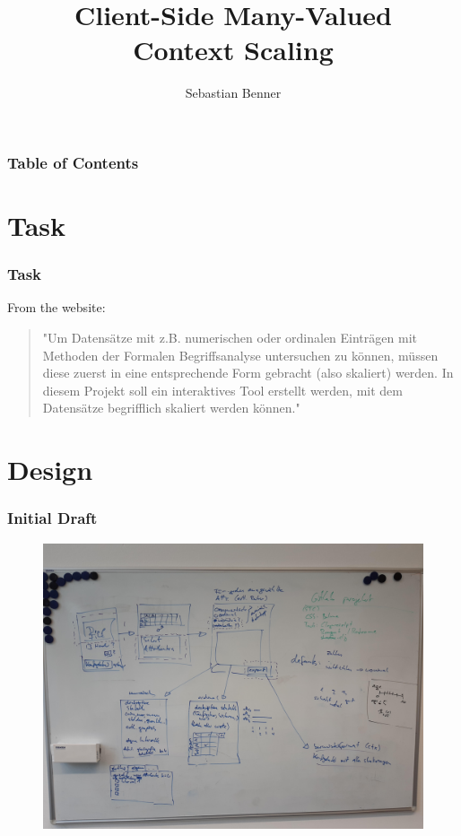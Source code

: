 \documentclass[]{beamer}
\title{Client-Side Many-Valued \protect\\ Context Scaling}
\author[]{Sebastian Benner}
\institute[]{FB16\\Universität Kassel}
\begin{document}
	\frame{\titlepage}
	
	
	\begin{frame}
		\frametitle{Table of Contents}
		\tableofcontents[]
	\end{frame}

	\section[]{Task}

	\begin{frame}
		\frametitle{Task}
		From the website:
		\newline
		\newline
		\begin{quote}
		"Um Datensätze mit z.B. numerischen oder ordinalen Einträgen mit Methoden der Formalen Begriffsanalyse untersuchen zu können, müssen diese zuerst in eine entsprechende Form gebracht (also skaliert) werden. In diesem Projekt soll ein interaktives Tool erstellt werden, mit dem Datensätze begrifflich skaliert werden können."
		\end{quote}
	\end{frame}

	\section[]{Design}

	\begin{frame}
		\frametitle{Initial Draft}
		\begin{figure}[H]
			\includegraphics[width=\linewidth]{../mock_up/draft_masterprojekt_whiteboardbild.jpg}
			\label{fig:p1}
		\end{figure}
	\end{frame}
\end{document}
